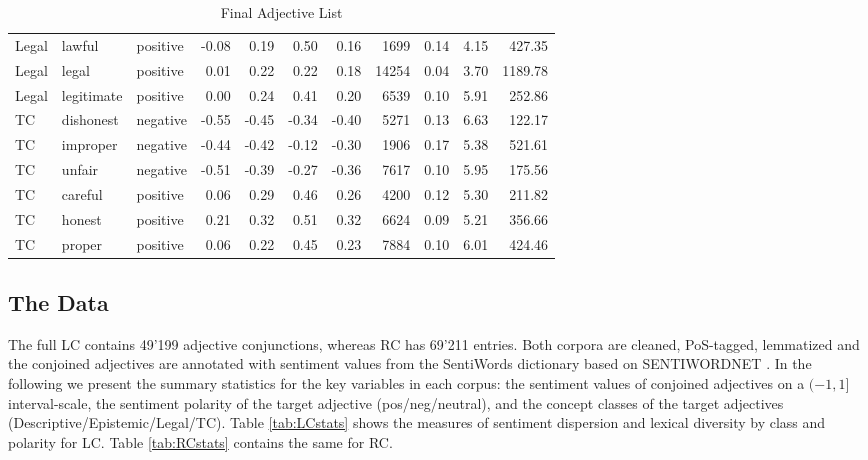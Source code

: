 \documentclass{article}
\begin{document}
\begin{table}[!h]
{\begin{minipage}{\textwidth}
\begin{tabular}{lllrrrrrrrr}
  Legal & lawful & positive & -0.08 & 0.19 & 0.50 & 0.16 & 1699 & 0.14 & 4.15 & 427.35 \\ 
  Legal & legal & positive & 0.01 & 0.22 & 0.22 & 0.18 & 14254 & 0.04 & 3.70 & 1189.78 \\ 
  Legal & legitimate & positive & 0.00 & 0.24 & 0.41 & 0.20 & 6539 & 0.10 & 5.91 & 252.86 \\ 
  TC & dishonest & negative & -0.55 & -0.45 & -0.34 & -0.40 & 5271 & 0.13 & 6.63 & 122.17 \\ 
  TC & improper & negative & -0.44 & -0.42 & -0.12 & -0.30 & 1906 & 0.17 & 5.38 & 521.61 \\ 
  TC & unfair & negative & -0.51 & -0.39 & -0.27 & -0.36 & 7617 & 0.10 & 5.95 & 175.56 \\ 
  TC & careful & positive & 0.06 & 0.29 & 0.46 & 0.26 & 4200 & 0.12 & 5.30 & 211.82 \\ 
  TC & honest & positive & 0.21 & 0.32 & 0.51 & 0.32 & 6624 & 0.09 & 5.21 & 356.66 \\ 
  TC & proper & positive & 0.06 & 0.22 & 0.45 & 0.23 & 7884 & 0.10 & 6.01 & 424.46 \\ 
   \hline
\end{tabular}
\end{minipage}
}
\caption{Final Adjective List}
\label{tab:ADJlist}
\end{table}


\subsection{The Data}


The full LC contains 49'199 adjective conjunctions, whereas RC has 69'211 entries. Both corpora are cleaned, PoS-tagged, lemmatized and the conjoined adjectives are annotated with sentiment values from the SentiWords dictionary based on SENTIWORDNET \citep{Esuli2006, Baccianella2010, Guerini2013, Gatti2016}. In the following we present the summary statistics for the key variables in each corpus: the sentiment values of conjoined adjectives on a $(-1,1]$ interval-scale, the sentiment polarity of the target adjective (pos/neg/neutral), and the concept classes of the target adjectives (Descriptive/Epistemic/Legal/TC). Table \ref{tab:LCstats} shows the measures of sentiment dispersion and lexical diversity by class and polarity for LC. Table \ref{tab:RCstats} contains the same for RC. 
\end{document}
